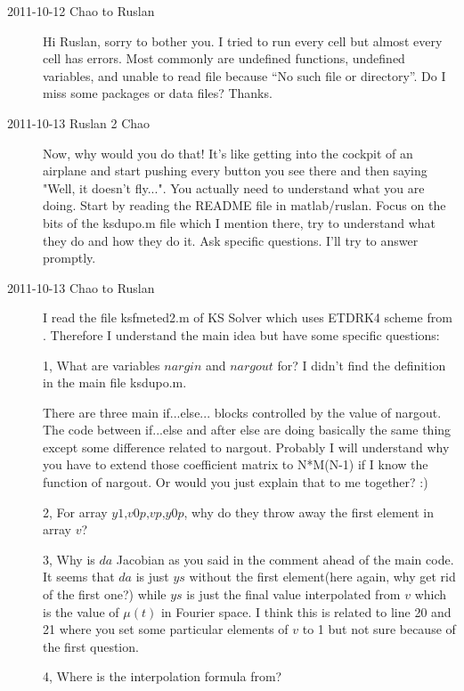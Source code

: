 \begin{description}

\item[2011-10-12 Chao to Ruslan]
Hi Ruslan, sorry to bother you. I tried to run every cell but almost every cell has errors. Most commonly are undefined functions, undefined variables, and unable to read file because ``No such file or directory''. Do I miss some packages or data files? Thanks.

\item[2011-10-13 Ruslan 2 Chao]  Now, why would you do that!  It's like getting into the cockpit of an airplane and start pushing every button you see there and then saying "Well, it doesn't fly...".  You actually need to understand what you are doing.  Start by reading the README file in matlab/ruslan.  Focus on the bits of the ksdupo.m file which I mention there, try to understand what they do and how they do it.  Ask specific questions.  I'll try to answer promptly.

\item[2011-10-13 Chao to Ruslan] I read the file ksfmeted2.m of KS Solver which uses ETDRK4 scheme from . Therefore I understand the main idea but have some specific questions:

1, What are variables $\textit{nargin}$ and $\textit{nargout}$ for? I didn't find the definition in the main file ksdupo.m.

   There are three main if...else... blocks controlled by the value of nargout. The code between if...else and after else are doing basically the same thing except some difference related to nargout. Probably I will understand why you have to extend those coefficient matrix to N*M(N-1) if I know the function of nargout. Or would you just explain that to me together? :)

2, For array $\textit{y1,v0p,vp,y0p}$, why do they throw away the first element in array $\textit{v}$?

3, Why is $\textit{da}$ Jacobian as you said in the comment ahead of the main code. It seems that $\textit{da}$ is just $\textit{ys}$ without the first element(here again, why get rid of the first one?) while $\textit{ys}$ is just the final value interpolated from $\textit{v}$ which is the value of $\mu(t)$ in Fourier space. I think this is related to line 20 and 21 where you set some particular elements of $\textit{v}$ to 1 but not sure because of the first question.

4, Where is the interpolation formula from?


\end{description}
